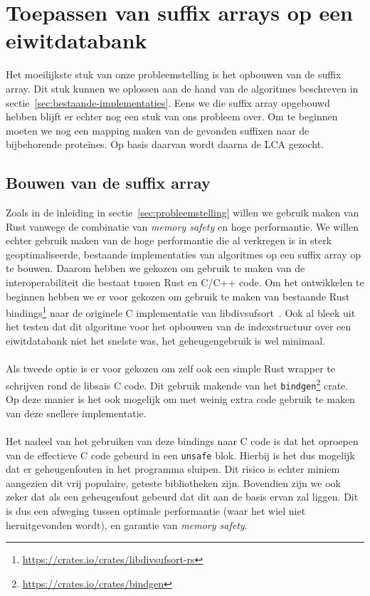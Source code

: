 \section{Toepassen van suffix arrays op een eiwitdatabank}\label{sec:toepassen-van-suffix-arrays-op-een-eiwitdatabank}
Het moeilijkste stuk van onze probleemstelling is het opbouwen van de suffix array.
Dit stuk kunnen we oplossen aan de hand van de algoritmes beschreven in sectie~\ref{sec:bestaande-implementaties}.
Eens we die suffix array opgebouwd hebben blijft er echter nog een stuk van ons probleem over.
Om te beginnen moeten we nog een mapping maken van de gevonden suffixen naar de bijbehorende proteïnes.
Op basis daarvan wordt daarna de LCA gezocht.

\subsection{Bouwen van de suffix array}
Zoals in de inleiding in sectie~\ref{sec:probleemstelling} willen we gebruik maken van Rust vanwege de combinatie van \textit{memory safety} en hoge performantie.
We willen echter gebruik maken van de hoge performantie die al verkregen is in sterk geoptimaliseerde, bestaande implementaties van algoritmes op een suffix array op te bouwen.
Daarom hebben we gekozen om gebruik te maken van de interoperabiliteit die bestaat tussen Rust en C/C++ code.
Om het ontwikkelen te beginnen hebben we er voor gekozen om gebruik te maken van bestaande Rust bindings\footnote{\url{https://crates.io/crates/libdivsufsort-rs}} naar de originele C implementatie van libdivsufsort~\cite{libdivsufsort}.
Ook al bleek uit het testen dat dit algoritme voor het opbouwen van de indexstructuur over een eiwitdatabank niet het snelste was, het geheugengebruik is wel minimaal.
\\ \\
Als tweede optie is er voor gekozen om zelf ook een simple Rust wrapper te schrijven rond de libsais C code.
Dit gebruik makende van het \texttt{bindgen}\footnote{\url{https://crates.io/crates/bindgen}} crate.
Op deze manier is het ook mogelijk om met weinig extra code gebruik te maken van deze snellere implementatie.
\\ \\
Het nadeel van het gebruiken van deze bindings naar C code is dat het oproepen van de effectieve C code gebeurd in een \texttt{unsafe} blok.
Hierbij is het dus mogelijk dat er geheugenfouten in het programma sluipen.
Dit risico is echter miniem aangezien dit vrij populaire, geteste bibliotheken zijn.
Bovendien zijn we ook zeker dat als een geheugenfout gebeurd dat dit aan de basis ervan zal liggen.
Dit is dus een afweging tussen optimale performantie (waar het wiel niet heruitgevonden wordt), en garantie van \textit{memory safety}.

